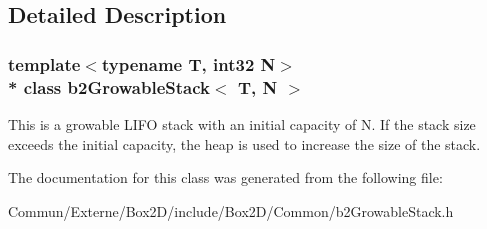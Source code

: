 \subsection{Detailed Description}
\subsubsection*{template$<$typename T, int32 N$>$\\*
class b2\+Growable\+Stack$<$ T, N $>$}

This is a growable L\+I\+FO stack with an initial capacity of N. If the stack size exceeds the initial capacity, the heap is used to increase the size of the stack. 

The documentation for this class was generated from the following file\+:\begin{DoxyCompactItemize}
\item 
Commun/\+Externe/\+Box2\+D/include/\+Box2\+D/\+Common/b2\+Growable\+Stack.\+h\end{DoxyCompactItemize}
